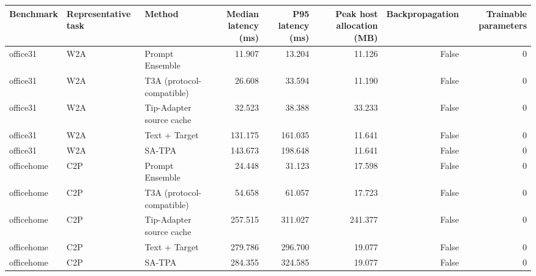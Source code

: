 \begin{tabular}{lllrrrrr}
\toprule
Benchmark & Representative task & Method & Median latency (ms) & P95 latency (ms) & Peak host allocation (MB) & Backpropagation & Trainable parameters \\
\midrule
office31 & W2A & Prompt Ensemble & 11.907 & 13.204 & 11.126 & False & 0 \\
office31 & W2A & T3A (protocol-compatible) & 26.608 & 33.594 & 11.190 & False & 0 \\
office31 & W2A & Tip-Adapter source cache & 32.523 & 38.388 & 33.233 & False & 0 \\
office31 & W2A & Text + Target & 131.175 & 161.035 & 11.641 & False & 0 \\
office31 & W2A & SA-TPA & 143.673 & 198.648 & 11.641 & False & 0 \\
officehome & C2P & Prompt Ensemble & 24.448 & 31.123 & 17.598 & False & 0 \\
officehome & C2P & T3A (protocol-compatible) & 54.658 & 61.057 & 17.723 & False & 0 \\
officehome & C2P & Tip-Adapter source cache & 257.515 & 311.027 & 241.377 & False & 0 \\
officehome & C2P & Text + Target & 279.786 & 296.700 & 19.077 & False & 0 \\
officehome & C2P & SA-TPA & 284.355 & 324.585 & 19.077 & False & 0 \\
\bottomrule
\end{tabular}
